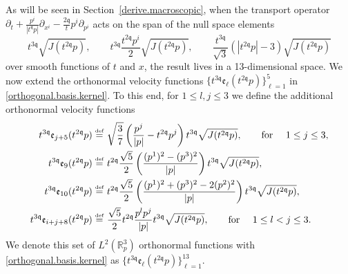 \documentclass[reqno]{amsart}
\newcommand{\eqdef }{\overset{\mbox{\tiny{def}}}{=}}
\newcommand{\pv}{p}
\newcommand{\pZ}{|\pv|}
\newcommand{\secref}[1]{Section~\ref{#1}}
\newcommand{\qq}{\mathfrak{q}}
\newcommand{\tq}{t^{\qq}}
\newcommand{\tqq}{t^{2\qq}}
\newcommand{\tTq}{t^{3\qq}}
\theoremstyle{definition}
\numberwithin{equation}{section}
\numberwithin{theorem}{section}
\begin{document}
As will be seen in \secref{derive.macroscopic}, when the transport operator \(\partial_t + \frac{\pv^i}{|\tq \pv|} \partial_{x^i} 
    -\frac{2\qq }{t} p^i \partial_{p^i} \) acts on the span of the null space elements 
\begin{equation}
 \tTq \sqrt{J(\tqq p)},\qquad \tTq \frac{\tqq p^{i}}{2}  \sqrt{J(\tqq p)},  \qquad 
\frac{\tTq}{\sqrt{3}} (|\tqq \pv |-3)\sqrt{J(\tqq p)}
\end{equation}
over smooth functions of \(t\) and \(x\), the result lives in a 13-dimensional space.  We now extend the orthonormal velocity  functions $\{ \tTq\mathfrak{e}_\ell(\tqq p)\}_{\ell=1}^5$ in \eqref{orthogonal.basis.kernel}. To this end, for $1\leq l,j \leq 3$ we define  the additional orthonormal velocity functions
\begin{equation}\label{orthogonal.basis.use}
    \begin{split}
         \tTq \mathfrak{e}_{j+5}(\tqq \pv) \eqdef &~ 
   \sqrt{\frac{3}{7}}
\left(\frac{p^j}{{\pZ}} -\tqq \pv^j\right)\tTq\sqrt{J(\tqq p)},\qquad  \text{for }\quad 1\leq j \leq 3,
      \\ 
   \tTq \mathfrak{e}_{9}(\tqq \pv) \eqdef &~ 
{t^{2\qq}} \frac{\sqrt{5}}{2}\left(\frac{(p^1)^2 -(p^3)^2}{{|p|}} \right)t^{3\qq}\sqrt{J(t^{2\qq} p)},
      \\ 
   \tTq \mathfrak{e}_{10}(\tqq \pv) \eqdef &~ 
{t^{2\qq}} \frac{\sqrt{5}}{2} \left(\frac{(p^1)^2+(p^3)^2 -2(p^2)^2}{{|p|}} \right)t^{3\qq}\sqrt{J(t^{2\qq} p)},
      \\ 
   \tTq \mathfrak{e}_{i+j+8}(\tqq \pv) \eqdef &~ 
\frac{\sqrt{5}}{2}{\tqq}\frac{ \pv^l \pv^{j}}{|p|}\tTq\sqrt{J(\tqq p)},\qquad  \text{for }\quad  1\leq l<j \leq 3.
    \end{split}
\end{equation}
We denote this set of $L^2(\mathbb{R}^3_p)$ orthonormal functions with \eqref{orthogonal.basis.kernel} as $\{\tTq \mathfrak{e}_{\ell}(\tqq \pv)\}_{\ell=1}^{13}$.
\end{document}
